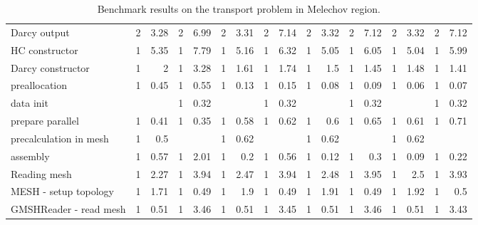 \begin{sidewaystable}[!htb]
\begin{tabular}{|l|r|r|r|r|r|r|r|r|r|r|r|r|r|r|r|r|}
  Darcy output                         &   2   &   3.28    &   2   &   6.99    &   2   &   3.31    &   2   &   7.14    &   2   &   3.32    &   2   &   7.12    &   2   &   3.32    &   2   &   7.12    \\
 HC constructor                         &   1   &   5.35    &   1   &   7.79    &   1   &   5.16    &   1   &   6.32    &   1   &   5.05    &   1   &   6.05    &   1   &   5.04    &   1   &   5.99    \\
  Darcy constructor                   &   1   &   2   &   1   &   3.28    &   1   &   1.61    &   1   &   1.74    &   1   &   1.5 &   1   &   1.45    &   1   &   1.48    &   1   &   1.41    \\
   preallocation                     &   1   &   0.45    &   1   &   0.55    &   1   &   0.13    &   1   &   0.15    &   1   &   0.08    &   1   &   0.09    &   1   &   0.06    &   1   &   0.07    \\
   data init                         &       &           &   1   &   0.32    &       &           &   1   &   0.32    &       &           &   1   &   0.32    &       &           &   1   &   0.32    \\
   prepare parallel                  &   1   &   0.41    &   1   &   0.35    &   1   &   0.58    &   1   &   0.62    &   1   &   0.6 &   1   &   0.65    &   1   &   0.61    &   1   &   0.71    \\
   precalculation in mesh            &   1   &   0.5     &       &           &   1   &   0.62    &       &           &   1   &   0.62    &   &           &   1   &   0.62    &       &      \\
   assembly                          &   1   &   0.57    &   1   &   2.01    &   1   &   0.2 &   1   &   0.56    &   1   &   0.12    &   1   &   0.3 &   1   &   0.09    &   1   &   0.22    \\
  Reading mesh                        &   1   &   2.27    &   1   &   3.94    &   1   &   2.47    &   1   &   3.94    &   1   &   2.48    &   1   &   3.95    &   1   &   2.5 &   1   &   3.93    \\
   MESH - setup topology             &   1   &   1.71    &   1   &   0.49    &   1   &   1.9 &   1   &   0.49    &   1   &   1.91    &   1   &   0.49    &   1   &   1.92    &   1   &   0.5 \\
  GMSHReader - read mesh            &   1   &   0.51    &   1   &   3.46    &   1   &   0.51    &   1   &   3.45    &   1   &   0.51    &   1   &   3.46    &   1   &   0.51    &   1   &   3.43    \\
\hline
\end{tabular}
\caption{Benchmark results on the transport problem in Melechov region.}
\label{tab:profiler_Mel1}
\end{sidewaystable}

